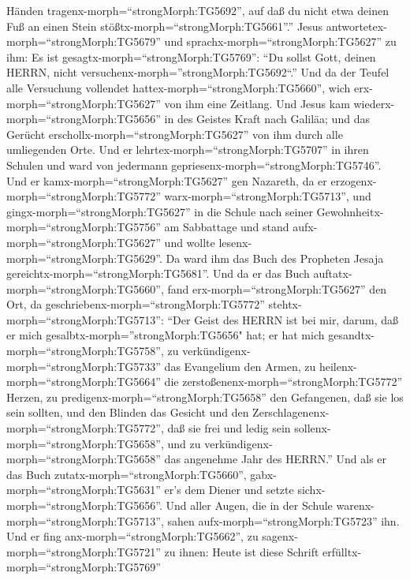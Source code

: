 Händen tragenx-morph=``strongMorph:TG5692'', auf daß du nicht etwa
deinen Fuß an einen Stein stößtx-morph=``strongMorph:TG5661''.''
 Jesus antwortetex-morph=``strongMorph:TG5679'' und
sprachx-morph=``strongMorph:TG5627'' zu ihm: Es ist
gesagtx-morph=``strongMorph:TG5769'': ``Du sollst Gott, deinen HERRN,
nicht versuchenx-morph=''strongMorph:TG5692``.''  Und da
der Teufel alle Versuchung vollendet
hattex-morph=``strongMorph:TG5660'', wich
erx-morph=``strongMorph:TG5627'' von ihm eine Zeitlang. 
Und Jesus kam wiederx-morph=``strongMorph:TG5656'' in des Geistes Kraft
nach Galiläa; und das Gerücht erschollx-morph=``strongMorph:TG5627'' von
ihm durch alle umliegenden Orte.  Und er
lehrtex-morph=``strongMorph:TG5707'' in ihren Schulen und ward von
jedermann gepriesenx-morph=``strongMorph:TG5746''.  Und er
kamx-morph=``strongMorph:TG5627'' gen Nazareth, da er
erzogenx-morph=``strongMorph:TG5772'' warx-morph=``strongMorph:TG5713'',
und gingx-morph=``strongMorph:TG5627'' in die Schule nach seiner
Gewohnheitx-morph=``strongMorph:TG5756'' am Sabbattage und stand
aufx-morph=``strongMorph:TG5627'' und wollte
lesenx-morph=``strongMorph:TG5629''.  Da ward ihm das Buch
des Propheten Jesaja gereichtx-morph=``strongMorph:TG5681''. Und da er
das Buch auftatx-morph=``strongMorph:TG5660'', fand
erx-morph=``strongMorph:TG5627'' den Ort, da
geschriebenx-morph=``strongMorph:TG5772''
stehtx-morph=``strongMorph:TG5713'':  ``Der Geist des HERRN
ist bei mir, darum, daß er mich gesalbtx-morph=''strongMorph:TG5656"
hat; er hat mich gesandtx-morph=``strongMorph:TG5758'', zu
verkündigenx-morph=``strongMorph:TG5733'' das Evangelium den Armen, zu
heilenx-morph=``strongMorph:TG5664'' die
zerstoßenenx-morph=``strongMorph:TG5772'' Herzen, zu
predigenx-morph=``strongMorph:TG5658'' den Gefangenen, daß sie los sein
sollten, und den Blinden das Gesicht und den
Zerschlagenenx-morph=``strongMorph:TG5772'', daß sie frei und ledig sein
sollenx-morph=``strongMorph:TG5658'',  und zu
verkündigenx-morph=``strongMorph:TG5658'' das angenehme Jahr des
HERRN.''  Und als er das Buch
zutatx-morph=``strongMorph:TG5660'', gabx-morph=``strongMorph:TG5631''
er's dem Diener und setzte sichx-morph=``strongMorph:TG5656''. Und aller
Augen, die in der Schule warenx-morph=``strongMorph:TG5713'', sahen
aufx-morph=``strongMorph:TG5723'' ihn.  Und er fing
anx-morph=``strongMorph:TG5662'', zu sagenx-morph=``strongMorph:TG5721''
zu ihnen: Heute ist diese Schrift erfülltx-morph=``strongMorph:TG5769''
